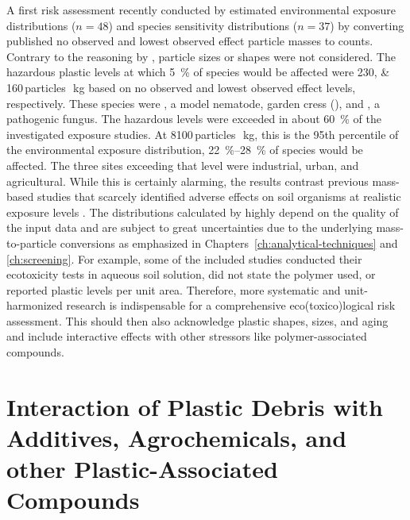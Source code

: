 A first risk assessment recently conducted by \citet{JacquesProbabilistic2021} estimated environmental exposure distributions ($n = 48$) and species sensitivity distributions ($n = 37$) by converting published no observed and lowest observed effect particle masses to counts. Contrary to the reasoning by \citet{BuksWhat2020}, particle sizes or shapes were not considered. The hazardous plastic levels at which \SI{5}{\percent} of species would be affected were \numlist{230;160}\,particles\,\si{\per\kilo\gram} based on no observed and lowest observed effect levels, respectively. These species were , a model nematode, garden cress (), and , a pathogenic fungus. The hazardous levels were exceeded in about \SI{60}{\percent} of the investigated exposure studies. At \num{8100}\,particles\,\si{\per\kilo\gram}, this is the \num{95}th percentile of the environmental exposure distribution, \SIrange{22}{28}{\percent} of species would be affected. The three sites exceeding that level were industrial, urban, and agricultural.
While this is certainly alarming, the results contrast previous mass-based studies that scarcely identified adverse effects on soil organisms at realistic exposure levels \citep{BuksWhat2020}. The distributions calculated by \citet{JacquesProbabilistic2021} highly depend on the quality of the input data and are subject to great uncertainties due to the underlying mass-to-particle conversions as emphasized in Chapters~\ref{ch:analytical-techniques} and \ref{ch:screening}. For example, some of the included studies conducted their ecotoxicity tests in aqueous soil solution, did not state the polymer used, or reported plastic levels per unit area.
Therefore, more systematic and unit-harmonized research is indispensable for a comprehensive eco(toxico)logical risk assessment. This should then also acknowledge plastic shapes, sizes, and aging and include interactive effects with other stressors like polymer-associated compounds.

\section[Interaction of Plastic Debris with Plastic-Associated Compounds]{Interaction of Plastic Debris with Additives, Agrochemicals, and other Plastic-Associated Compounds}
\label{sec:general-discussion:pacs}

